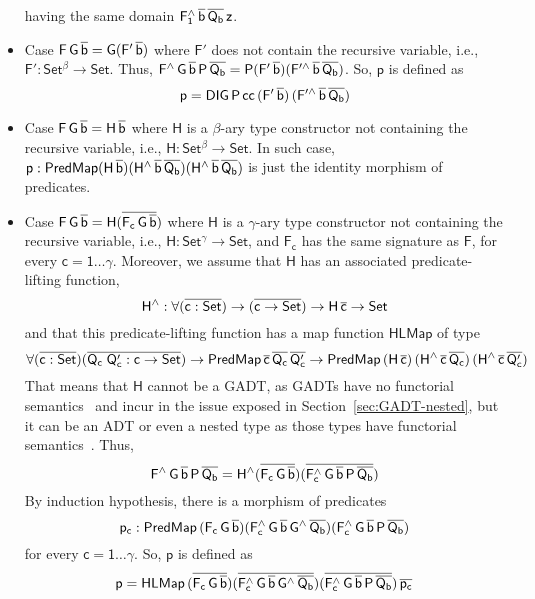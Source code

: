 \documentclass[9pt]{entcs} \usepackage{entcsmacro}
\begin{document}
\begin{itemize}
having the same domain $\mathsf{F_1^{\wedge}\,\overline{b}\,\overline{Q_b}\,z}$.
\item Case $\mathsf{F\,G\,\overline{b} = G(F'\,\overline{b})}$
where $\mathsf{F'}$ does not contain the recursive variable,
i.e., $\mathsf{F' : Set^\beta \to Set}$.
Thus, $\mathsf{F^{\wedge}\,G\,\overline{b}\,P\,\overline{Q_b} = P (F'\,\overline{b}) (F'^{\wedge}\,\overline{b}\,\overline{Q_b})}$.
So, $\mathsf{p}$ is defined as
\[
\mathsf{p = DIG\,P\,cc\,(F'\,\overline{b})\,(F'^{\wedge}\,\overline{b}\,\overline{Q_b})}
\]
\item Case $\mathsf{F\,G\,\overline{b} = H\,\overline{b}}$
where $\mathsf{H}$ is a $\mathsf{\beta}$-ary type constructor not containing the recursive variable,
i.e., $\mathsf{H : Set^\beta \to Set}$.
In such case, $\mathsf{p : PredMap (H\,\overline{b}) (H^{\wedge}\,\overline{b}\,\overline{Q_b}) (H^{\wedge}\,\overline{b}\,\overline{Q_b})}$
is just the identity morphism of predicates.
\item Case $\mathsf{F\,G\,\overline{b} = H (\overline{F_c\,G\,\overline{b}})}$
where $\mathsf{H}$ is a $\mathsf{\gamma}$-ary type constructor not containing the recursive variable,
i.e., $\mathsf{H : Set^\gamma \to Set}$,
and $\mathsf{F_c}$ has the same signature as $\mathsf{F}$, for every $\mathsf{c = 1 \dots \gamma}$.
Moreover, we assume that $\mathsf{H}$ has an associated predicate-lifting function,
\[
\mathsf{H^{\wedge} : \forall (\overline{c : Set}) \to (\overline{c \to Set}) \to H\,\overline{c} \to Set}
\]
and that this predicate-lifting function has a map function $\mathsf{HLMap}$ of type
\[
\mathsf{\forall (\overline{c : Set}) (\overline{Q_c\;Q_c' : c \to Set}) \to PredMap\,\overline{c}\,\overline{Q_c}\,\overline{Q_c'}
\to PredMap\,(H\,\overline{c})\,(H^{\wedge}\,\overline{c}\,\overline{Q_c})\,(H^{\wedge}\,\overline{c}\,\overline{Q_c'})}
\]
That means that $\mathsf{H}$ cannot be a GADT,
as GADTs have no functorial semantics~\cite{HaskellPaper}
and incur in the issue exposed in Section~\ref{sec:GADT-nested},
but it can be an ADT or even a nested type as those types have functorial semantics~\cite{jp19,jgj21}.
Thus,
\[
\mathsf{F^{\wedge}\,G\,\overline{b}\,P\,\overline{Q_b} = H^{\wedge} (\overline{F_c\,G\,\overline{b}}) (\overline{F_c^{\wedge}\,G\,\overline{b}\,P\,\overline{Q_b}})}
\]
By induction hypothesis, there is a morphism of predicates
\[
\mathsf{p_c : PredMap\,(F_c\,G\,\overline{b}) (F_c^{\wedge}\,G\,\overline{b}\,G^{\wedge}\,\overline{Q_b}) (F_c^{\wedge}\,G\,\overline{b}\,P\,\overline{Q_b})}
\]
for every $\mathsf{c = 1 \dots \gamma}$.
So, $\mathsf{p}$ is defined as
\[
\mathsf{p
= HLMap\,(\overline{F_c\,G\,\overline{b}}) (\overline{F_c^{\wedge}\,G\,\overline{b}\,G^{\wedge}\,\overline{Q_b}}) (\overline{F_c^{\wedge}\,G\,\overline{b}\,P\,\overline{Q_b}})\,\overline{p_c}}
\]
\end{itemize}
\end{document}
